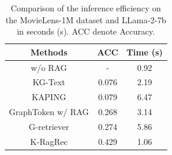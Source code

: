 \begin{table}[t]
  \centering
  \caption{ 
   Comparison of the inference efficiency on the MovieLens-1M dataset and LLama-2-7b in seconds (s). ACC denote Accuracy.}
  \vskip -0.05in
    \scalebox{0.72}
{
    \begin{tabular}{c|c|c}
    \toprule
    \toprule
    \multirow{1}{*}{Methods}  & \multirow{1}{*}{ACC} & \multirow{1}{*}{Time (s)}  \\
    \midrule
    w/o RAG & - & 0.92 \\
    KG-Text  & 0.076 & 2.19 \\
    KAPING & 0.079 & 6.47 \\
    GraphToken w/ RAG & 0.268 & 3.14 \\
    G-retriever & 0.274 & 5.86 \\
    \midrule
    K-RagRec & 0.429 & 1.06 \\
    \bottomrule
    \bottomrule
    \end{tabular}%
}
  \label{tab:time}%
  \vskip -0.18in
\end{table}%